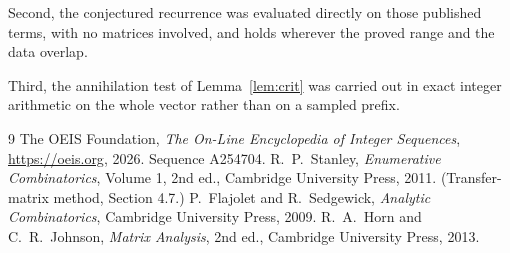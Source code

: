 \documentclass[11pt,a4paper]{article}
\theoremstyle{plain}
\theoremstyle{definition}
\begin{document}
Second, the conjectured recurrence was evaluated directly on those published terms, with no
matrices involved, and holds wherever the proved range and the data overlap.

Third, the annihilation test of Lemma~\ref{lem:crit} was carried out in exact integer
arithmetic on the whole vector rather than on a sampled prefix.

\begin{thebibliography}{9}
 The OEIS Foundation, \emph{The On-Line Encyclopedia of Integer
Sequences}, \url{https://oeis.org}, 2026. Sequence A254704.
 R.~P.~Stanley, \emph{Enumerative Combinatorics}, Volume 1, 2nd ed.,
Cambridge University Press, 2011. (Transfer-matrix method, Section 4.7.)
 P.~Flajolet and R.~Sedgewick, \emph{Analytic Combinatorics}, Cambridge
University Press, 2009.
 R.~A.~Horn and C.~R.~Johnson, \emph{Matrix Analysis}, 2nd ed., Cambridge
University Press, 2013.
\end{thebibliography}
\end{document}
